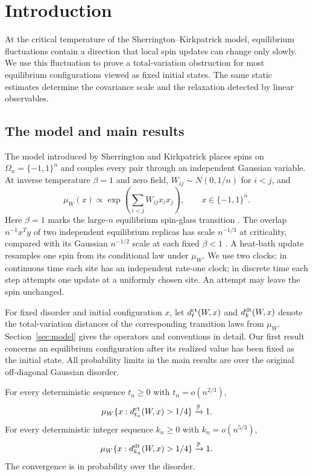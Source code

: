 \section{Introduction}\label{sec:introduction}
At the critical temperature of the Sherrington--Kirkpatrick model,
equilibrium fluctuations contain a direction that local spin updates
can change only slowly. We use this fluctuation to prove a total-variation
obstruction for most equilibrium configurations viewed as fixed initial
states. The same static estimates determine the covariance scale and
the relaxation detected by linear observables.

\subsection{The model and main results}
The model introduced by Sherrington and Kirkpatrick \cite{sk1975}
places spins on $\Omega_n=\{-1,1\}^n$ and couples every pair through an
independent Gaussian variable. At inverse temperature $\beta=1$ and zero field,
$W_{ij}\sim N(0,1/n)$ for $i<j$, and
\begin{equation}\label{eq:intro-law}
 \mu_W(x)\propto
 \exp\!\left(\sum_{i<j}W_{ij}x_ix_j\right),
 \qquad x\in\{-1,1\}^n.
\end{equation}
Here $\beta=1$ marks the large-$n$ equilibrium spin-glass transition
\cite[Section~1, after Equation~(1.4)]{duHuang2026FreeEnergy}. The overlap
$n^{-1}x^Ty$ of two independent equilibrium replicas has scale $n^{-1/3}$
at criticality, compared with its Gaussian $n^{-1/2}$ scale at each fixed
$\beta<1$ \cite[Equation~(1.1) and Theorem~1.1]{duHuang2026Overlap}.
A heat-bath update resamples one spin from its conditional law under
$\mu_W$. We use two clocks: in continuous time each site has an independent
rate-one clock; in discrete time each step attempts one update at a
uniformly chosen site. An attempt may leave the spin unchanged.

For fixed disorder and initial configuration $x$, let
$d_t^{\rm ct}(W,x)$ and $d_k^{\rm dt}(W,x)$ denote the total-variation
distances of the corresponding transition laws from $\mu_W$.
Section~\ref{sec:model} gives the operators and conventions in detail.
Our first result concerns an equilibrium configuration after its realized
value has been fixed as the initial state. All probability limits in the
main results are over the original off-diagonal Gaussian disorder.

\begin{theorem}\label{thm:gibbs-start}
For every deterministic sequence $t_n\ge0$ with $t_n=o(n^{2/3})$,
\[
 \mu_W\{x:d_{t_n}^{\rm ct}(W,x)>1/4\}
 \xrightarrow{\mathbb P}1.
\]
For every deterministic integer sequence $k_n\ge0$ with $k_n=o(n^{5/3})$,
\[
 \mu_W\{x:d_{k_n}^{\rm dt}(W,x)>1/4\}
 \xrightarrow{\mathbb P}1.
\]
The convergence is in probability over the disorder.
\end{theorem}

